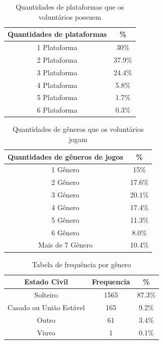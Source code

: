\documentclass[11pt,a4paper]{article}
\begin{document}
\begin{table}[h!]
 \begin{center}
\begin{tabular}{c|c}
\hline
Quantidades de plataformas & \% \\
\hline
1 Plataforma & 30\% \\
\hline
2 Plataforma & 37.9\% \\
\hline
3 Plataforma  & 24.4\% \\
\hline
4 Plataforma & 5.8\% \\
\hline
5  Plataforma  & 1.7\%\\
\hline
6  Plataforma & 0.3\% \\
\hline
\end{tabular}
    \caption{Quantidades de plataformas que os voluntários possuem}
     \label{table:4}
  \end{center}
\end{table}

\begin{table}[h!]
 \begin{center}
\begin{tabular}{c|c}
\hline
Quantidades de gêneros de jogos & \% \\
\hline
1 Gênero & 15\% \\
\hline
2 Gênero & 17.6\% \\
\hline
3 Gênero  & 20.1\% \\
\hline
4 Gênero & 17.4\% \\
\hline
5  Gênero  & 11.3\%\\
\hline
6  Gênero & 8.0\% \\
\hline
Mais de 7 Gênero& 10.4\% \\
\hline
\end{tabular}
    \caption{Quantidades de gêneros que os voluntários jogam}
     \label{table:5}
  \end{center}
\end{table}

\begin{table}[h!]
 \begin{center}
\begin{tabular}{c|c|c}
\hline
Estado Civil & Frequencia  & \%\\
\hline
Solteiro & 1565 & 87.3\%  \\
\hline
Casado ou União Estável & 165 & 9.2\% \\
\hline
Outro & 61 & 3.4\% \\
\hline
Viuvo & 1  & 0.1\%\\
\hline
\end{tabular}
    \caption{Tabela de frequência por gênero}
     \label{table:6}
  \end{center}
\end{table}
\end{document}
